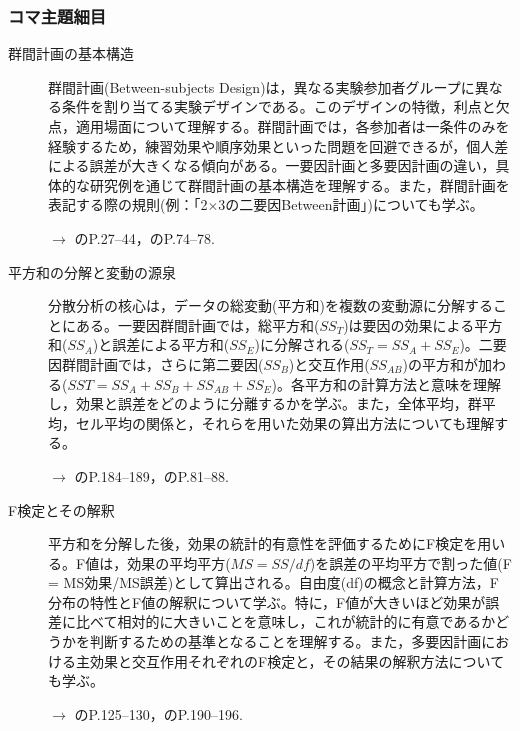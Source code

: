 \subsubsection{コマ主題細目}
\begin{description}
	\item[群間計画の基本構造] 群間計画(Between-subjects Design)は，異なる実験参加者グループに異なる条件を割り当てる実験デザインである。このデザインの特徴，利点と欠点，適用場面について理解する。群間計画では，各参加者は一条件のみを経験するため，練習効果や順序効果といった問題を回避できるが，個人差による誤差が大きくなる傾向がある。一要因計画と多要因計画の違い，具体的な研究例を通じて群間計画の基本構造を理解する。また，群間計画を表記する際の規則(例：「2$\times$3の二要因Between計画」)についても学ぶ。
	      \begin{flushright}
		      $\to$ \textcite{Toyoda201706}のP.27--44，\textcite{kosugi2018}のP.74--78.
	      \end{flushright}

	\item[平方和の分解と変動の源泉] 分散分析の核心は，データの総変動(平方和)を複数の変動源に分解することにある。一要因群間計画では，総平方和($SS_T$)は要因の効果による平方和($SS_A$)と誤差による平方和($SS_E$)に分解される($SS_T = SS_A + SS_E$)。二要因群間計画では，さらに第二要因($SS_B$)と交互作用($SS_{AB}$)の平方和が加わる($SST = SS_A + SS_B + SS_{AB} + SS_E$)。各平方和の計算方法と意味を理解し，効果と誤差をどのように分離するかを学ぶ。また，全体平均，群平均，セル平均の関係と，それらを用いた効果の算出方法についても理解する。
	      \begin{flushright}
		      $\to$ \textcite{Yamada2004}のP.184--189，\textcite{kosugi2018}のP.81--88.
	      \end{flushright}

	\item[F検定とその解釈] 平方和を分解した後，効果の統計的有意性を評価するためにF検定を用いる。F値は，効果の平均平方($MS = SS/df$)を誤差の平均平方で割った値(F = MS効果/MS誤差)として算出される。自由度(df)の概念と計算方法，F分布の特性とF値の解釈について学ぶ。特に，F値が大きいほど効果が誤差に比べて相対的に大きいことを意味し，これが統計的に有意であるかどうかを判断するための基準となることを理解する。また，多要因計画における主効果と交互作用それぞれのF検定と，その結果の解釈方法についても学ぶ。
	      \begin{flushright}
		      $\to$ \textcite{Kawabata201408}のP.125--130，\textcite{Yamada2004}のP.190--196.
	      \end{flushright}


\end{description}
